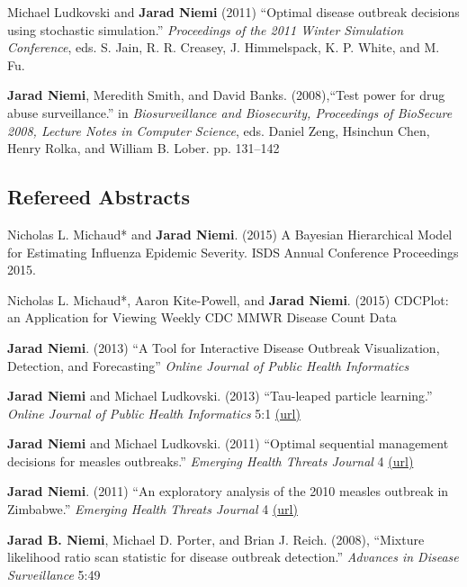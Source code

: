 \documentclass[overlapped,line]{res}
\begin{document}
\begin{resume}
Michael Ludkovski and {\bf Jarad Niemi} (2011) ``Optimal disease outbreak decisions using stochastic simulation.'' \emph{Proceedings of the 2011 Winter Simulation Conference}, eds. S. Jain, R. R. Creasey, J. Himmelspack, K. P. White, and M. Fu.

{\bf Jarad Niemi}, Meredith Smith, and David Banks. (2008),``Test power for drug abuse surveillance.'' in \emph{Biosurveillance and Biosecurity, Proceedings of BioSecure 2008, Lecture Notes in Computer Science},  eds. Daniel Zeng, Hsinchun Chen, Henry Rolka, and William B. Lober. pp. 131--142



\subsection{\bf Refereed Abstracts}

Nicholas L. Michaud* and {\bf Jarad Niemi}. (2015) A Bayesian Hierarchical Model for Estimating Influenza Epidemic Severity. ISDS Annual Conference Proceedings 2015.

Nicholas L. Michaud*, Aaron Kite-Powell, and {\bf Jarad Niemi}. (2015) CDCPlot: an Application for Viewing Weekly CDC MMWR Disease Count Data

{\bf Jarad Niemi}. (2013) ``A Tool for Interactive Disease Outbreak Visualization, Detection, and Forecasting'' \emph{Online Journal of Public Health Informatics}

{\bf Jarad Niemi} and Michael Ludkovski. (2013) ``Tau-leaped particle learning.'' \emph{Online Journal of Public Health Informatics} 5:1 \href{http://dx.doi.org/10.5210%2Fojphi.v5i1.4575}{(url)}




{\bf Jarad Niemi} and Michael Ludkovski. (2011) ``Optimal sequential management decisions for measles outbreaks.'' \emph{Emerging Health Threats Journal} 4 \href{http://dx.doi.org/10.3402/ehtj.v4i0.11907}{(url)}




{\bf Jarad Niemi}. (2011) ``An exploratory analysis of the 2010 measles outbreak in Zimbabwe.'' \emph{Emerging Health Threats Journal} 4 \href{http://dx.doi.org/10.3402/ehtj.v4i0.11907}{(url)}


{\bf Jarad B. Niemi}, Michael D. Porter, and Brian J. Reich. (2008), ``Mixture likelihood ratio scan statistic for disease outbreak detection.'' \emph{Advances in Disease Surveillance} 5:49




\end{resume}
\end{document}

